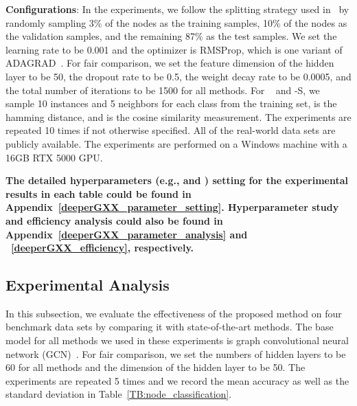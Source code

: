 \noindent\textbf{Configurations}: In the experiments, we follow the splitting strategy used in~\citep{DBLP:conf/iclr/ZhaoA20} by randomly sampling 3\% of the nodes as the training samples, 10\% of the nodes as the validation samples, and the remaining 87\% as the test samples. We set the learning rate to be 0.001 and the optimizer is RMSProp, which is one variant of ADAGRAD~\citep{DBLP:journals/jmlr/DuchiHS11}. For fair comparison, we set the feature dimension of the hidden layer to be 50, the dropout rate to be 0.5, the weight decay rate to be 0.0005, and the total number of iterations to be 1500 for all methods. For \name~ and \name-S, we sample 10 instances and 5 neighbors for each class from the training set,  is the hamming distance, and  is the cosine similarity measurement. The experiments are repeated 10 times if not otherwise specified.
All of the real-world data sets are publicly available. The experiments are performed on a Windows machine with a 16GB RTX 5000 GPU. 

\textbf{The detailed hyperparameters (e.g.,  and ) setting for the experimental results in each table could be found in Appendix~\ref{deeperGXX_parameter_setting}. Hyperparameter study and efficiency analysis could also be found in Appendix~\ref{deeperGXX_parameter_analysis} and ~\ref{deeperGXX_efficiency}, respectively.}


















\subsection{Experimental Analysis}
In this subsection, we evaluate the effectiveness of the proposed method on four benchmark data sets by comparing it with state-of-the-art methods. The base model for all methods we used in these experiments is graph convolutional neural network (GCN)~\citep{DBLP:conf/iclr/KipfW17}. For fair comparison, we set the numbers of hidden layers to be 60 for all methods and the dimension of the hidden layer to be 50. The experiments are repeated 5 times and we record the mean accuracy as well as the standard deviation in Table~\ref{TB:node_classification}. 


